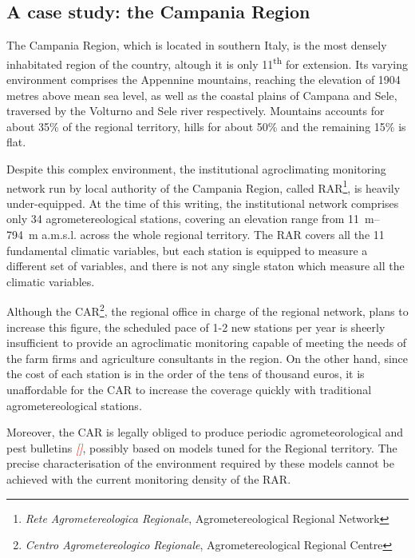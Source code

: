 \documentclass[authoryear,preprint,review,12pt]{elsarticle}
\newcommand{\note}[1]{\emph{\textcolor{red}{#1}}}
\begin{document}
\subsection{A case study: the Campania Region}
The Campania Region, which is located in southern Italy, is the most densely inhabitated region of the country, altough it is only 11\textsuperscript{th} for extension. Its varying environment comprises the Appennine mountains, reaching the elevation of 1904 metres above mean sea level, as well as the coastal plains of Campana and Sele, traversed by the Volturno and Sele river respectively. Mountains accounts for about 35\% of the regional territory, hills for about 50\% and the remaining 15\% is flat.

Despite this complex environment, the institutional agroclimating monitoring network run by local authority of the Campania Region, called RAR\footnote{\emph{Rete Agrometereologica Regionale}, Agrometereological Regional Network}, is heavily under-equipped. At the time of this writing, the institutional network comprises only 34 agrometereological stations, covering an elevation range from \SIrange{11}{794}{\metre} a.m.s.l. across the whole regional territory. The RAR covers all the 11 fundamental climatic variables, but each station is equipped to measure a different set of variables, and there is not any single staton which measure all the climatic variables.

Although the CAR\footnote{\emph{Centro Agrometereologico Regionale}, Agrometereological Regional Centre}, the regional office in charge of the regional network, plans to increase this figure, the scheduled pace of 1-2 new stations per year is sheerly insufficient to provide an agroclimatic monitoring capable of meeting the needs of the farm firms and agriculture consultants in the region. 
On the other hand, since the cost of each station is in the order of the tens of thousand euros, it is unaffordable for the CAR to increase the coverage quickly with traditional agrometereological stations.

Moreover, the CAR is legally obliged to produce periodic agrometeorological and pest bulletins \note{[]}, possibly based on models tuned for the Regional territory.
The precise characterisation of the environment required by these models cannot be achieved with the current monitoring density of the RAR. 
\end{document}
